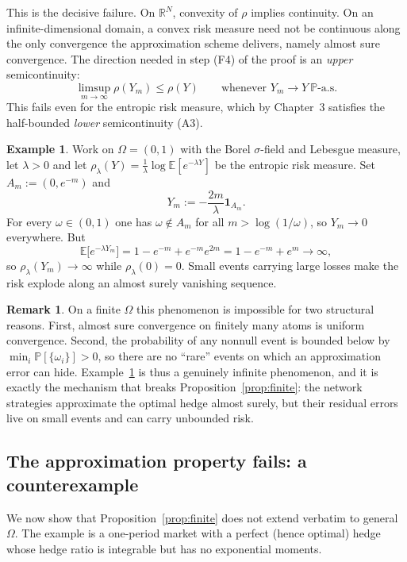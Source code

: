 \documentclass[11pt,a4paper]{report}
\numberwithin{equation}{chapter}
\theoremstyle{plain}
\theoremstyle{definition}
\newtheorem{example}[proposition]{Example}
\newtheorem{remark}[proposition]{Remark}
\newcommand{\E}{\mathbb{E}}
\newcommand{\PP}{\mathbb{P}}
\newcommand{\R}{\mathbb{R}}
\newcommand{\as}{\ \PP\text{-a.s.}}
\begin{document}
This is the decisive failure. On $\R^N$, convexity of $\rho$ implies continuity. On an infinite-dimensional domain, a convex risk measure need not be continuous along the only convergence the approximation scheme delivers, namely almost sure convergence. The direction needed in step (F4) of the proof is an \emph{upper} semicontinuity:
\[
    \limsup_{m\to\infty}\rho(Y_m)\le\rho(Y)\qquad\text{whenever }Y_m\to Y\as
\]
This fails even for the entropic risk measure, which by Chapter~3 satisfies the half-bounded \emph{lower} semicontinuity (A3).

\begin{example}\label{ex:explosion}
    Work on $\Omega=(0,1)$ with the Borel $\sigma$-field and Lebesgue measure, let $\lambda>0$ and let $\rho_\lambda(Y)=\frac{1}{\lambda}\log\E[e^{-\lambda Y}]$ be the entropic risk measure. Set $A_m:=(0,e^{-m})$ and
    \[
        Y_m:=-\frac{2m}{\lambda}\mathbf{1}_{A_m}.
    \]
    For every $\omega\in(0,1)$ one has $\omega\notin A_m$ for all $m>\log(1/\omega)$, so $Y_m\to0$ everywhere. But
    \[
        \E\bigl[e^{-\lambda Y_m}\bigr]=1-e^{-m}+e^{-m}e^{2m}=1-e^{-m}+e^{m}\longrightarrow\infty,
    \]
    so $\rho_\lambda(Y_m)\to\infty$ while $\rho_\lambda(0)=0$. Small events carrying large losses make the risk explode along an almost surely vanishing sequence.
\end{example}

\begin{remark}\label{rem:finite-immune}
    On a finite $\Omega$ this phenomenon is impossible for two structural reasons. First, almost sure convergence on finitely many atoms is uniform convergence. Second, the probability of any nonnull event is bounded below by $\min_i\PP[\{\omega_i\}]>0$, so there are no ``rare'' events on which an approximation error can hide. Example~\ref{ex:explosion} is thus a genuinely infinite phenomenon, and it is exactly the mechanism that breaks Proposition~\ref{prop:finite}: the network strategies approximate the optimal hedge almost surely, but their residual errors live on small events and can carry unbounded risk.
\end{remark}

\subsection*{The approximation property fails: a counterexample}

We now show that Proposition~\ref{prop:finite} does not extend verbatim to general $\Omega$. The example is a one-period market with a perfect (hence optimal) hedge whose hedge ratio is integrable but has no exponential moments.
\end{document}
